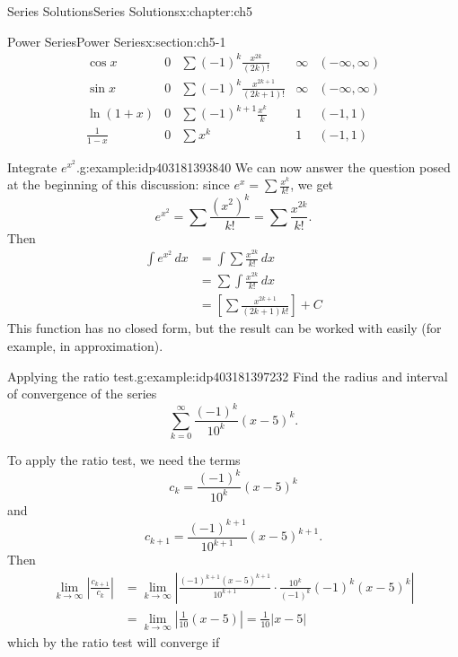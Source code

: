 \documentclass[oneside,10pt,]{book}
\numberwithin{equation}{section}
\newcommand{\abs}[1]{\left\vert#1\right\vert}
\numberwithin{equation}{section}
\newcommand{\amp}{&}
\begin{document}
\begin{chapterptx}{Series Solutions}{}{Series Solutions}{}{}{x:chapter:ch5}
\begin{sectionptx}{Power Series}{}{Power Series}{}{}{x:section:ch5-1}
\begin{equation*}
\begin{array}{c|c|c|c|c}
\cos x \amp 0 \amp \sum (-1)^k \frac{x^{2k}}{(2k)!} \amp \infty \amp (-\infty, \infty) \\
\sin x \amp 0 \amp \sum (-1)^k \frac{x^{2k+1}}{(2k+1)!} \amp \infty \amp (-\infty, \infty) \\
\ln (1+x) \amp 0 \amp \sum (-1)^{k+1} \frac{x^k}{k} \amp 1 \amp (-1, 1) \\
\frac{1}{1-x} \amp 0 \amp \sum x^k \amp 1 \amp (-1,1)
\end{array}
\end{equation*}
%
\begin{example}{Integrate \(e^{x^2}\).}{g:example:idp403181393840}%
We can now answer the question posed at the beginning of this discussion: since \(e^x = \sum \frac{x^k}{k!}\), we get%
\begin{equation*}
e^{x^2} = \sum \frac{(x^2)^k}{k!} = \sum \frac{x^{2k}}{k!}.
\end{equation*}
Then%
\begin{align*}
\int e^{x^2} \, dx \amp = \int \sum \frac{x^{2k}}{k!}\,dx \\
\amp = \sum \int \frac{x^{2k}}{k!} \, dx \\
\amp = \left[\sum \frac{x^{2k+1}}{(2k+1) k!}\right] + C
\end{align*}
This function has no closed form, but the result can be worked with easily (for example, in approximation).%
\end{example}
\begin{example}{Applying the ratio test.}{g:example:idp403181397232}%
Find the radius and interval of convergence of the series%
\begin{equation*}
\sum_{k=0}^\infty \frac{(-1)^k}{10^k} (x-5)^k.
\end{equation*}
%
\par
To apply the ratio test, we need the terms%
\begin{equation*}
c_k = \frac{(-1)^k}{10^k}(x-5)^k
\end{equation*}
and%
\begin{equation*}
c_{k+1} = \frac{(-1)^{k+1}}{10^{k+1}}(x-5)^{k+1}.
\end{equation*}
Then%
\begin{align*}
\lim_{k\to \infty} \abs{\frac{c_{k+1}}{c_k}} \amp = \lim_{k\to\infty} \abs{\frac{(-1)^{k+1}(x-5)^{k+1}}{10^{k+1}}\cdot\frac{10^k}{(-1)^k}{(-1)^k(x-5)^k}}\\
\amp = \lim_{k\to\infty} \abs{\frac{1}{10}(x-5)} = \frac{1}{10}\abs{x-5}
\end{align*}
which by the ratio test will converge if%

\end{example}
\end{sectionptx}
\end{chapterptx}
\end{document}
